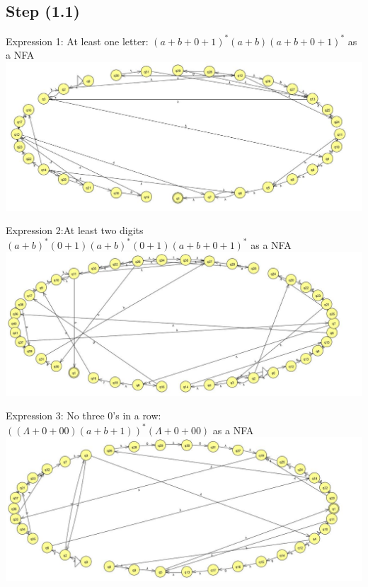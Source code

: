 \documentclass{article}
\theoremstyle{remark}
\numberwithin{equation}{section}
\begin{document}
	\section{}
	\subsection*{Step (1.1)}
	Expression 1: At least one letter: $(a+b+0+1)^*(a+b)(a+b+0+1)^*$ as a NFA\\
	\includegraphics[width=\textwidth]{E1_NFA.jpg}
	
	\newpage Expression 2:At least two digits $(a+b)^*(0+1)(a+b)^*(0+1)(a+b+0+1)^*$ as a NFA\\
	\includegraphics[width=\textwidth]{E2_NFA.jpg}
	
	Expression 3: No three 0’s in a row: $((\Lambda+0+00)(a+b+1))^*
	(\Lambda+0+00)$ as a NFA\\
	\includegraphics[width=\textwidth]{E3_NFA.jpg}\\
	\newpage
\end{document}
